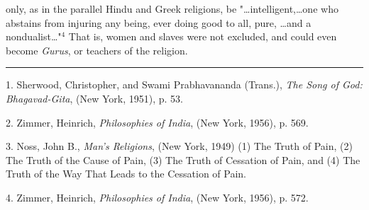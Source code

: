 only, as in the parallel Hindu and Greek religions, be
"\dots intelligent,\dots one who abstains from injuring any being,
ever doing good to all, pure, \dots and a nondualist\dots"$^{4}$
That is, women and slaves were not excluded, and could even
become \textit{Gurus}, or teachers of the religion.\par
\vspace*{\fill}
\noindent\rule{0.25\textwidth}{0.4pt}\par
1. Sherwood, Christopher, and Swami Prabhavananda (Trans.),
\textit{The Song of God: Bhagavad-Gita}, (New York, 1951), p. 53.\par
2. Zimmer, Heinrich, \textit{Philosophies of India}, (New York,
1956), p. 569.\par
3. Noss, John B., \textit{Man's Religions}, (New York, 1949) (1)
The Truth of Pain, (2) The Truth of the Cause of Pain, (3)
The Truth of Cessation of Pain, and (4) The Truth of the
Way That Leads to the Cessation of Pain.\par
4. Zimmer, Heinrich, \textit{Philosophies of India}, (New York,
1956), p. 572.\par

\newpage

